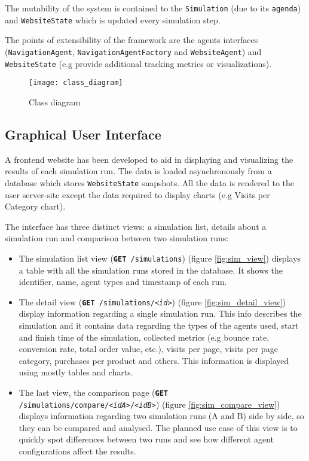The mutability of the system is contained to the \texttt{Simulation} (due to 
its \texttt{agenda}) and \texttt{WebsiteState} which is updated every 
simulation step.

The points of extensibility of the framework are the agents interfaces 
(\texttt{NavigationAgent}, \texttt{NavigationAgentFactory} and 
\texttt{WebsiteAgent}) and \texttt{WebsiteState} (e.g provide additional 
tracking metrics or visualizations).

\begin{figure}[h]
    \begin{center}
        \leavevmode
        \texttt{[image: class\_diagram]}
        \caption{Class diagram}
        \label{fig:class}
    \end{center}
\end{figure}


\subsection{Graphical User Interface}

A frontend website has been developed to aid in displaying and visualizing the 
results of each simulation run. The data is loaded asynchronously from a 
database which stores \texttt{WebsiteState} snapshots. All the data is rendered 
to the user server-site except the data required to display charts (e.g Visits 
per Category chart).

The interface has three distinct views: a simulation list, details about a 
simulation run and comparison between two simulation runs:

\begin{itemize}
    \item The simulation list view (\texttt{\textbf{GET} /simulations}) (figure 
    \ref{fig:sim_view}) displays a table 
    with all the simulation runs stored in the database. It shows the 
    identifier, name, agent types and timestamp of each run.
    \item The detail view (\texttt{\textbf{GET} /simulations/\textit{<id>}}) 
    (figure \ref{fig:sim_detail_view})
    display information regarding a single simulation run. This info describes 
    the simulation and it contains data regarding the types of the agents used, 
    start and finish time of the simulation, collected metrics (e.g bounce 
    rate, conversion rate, total order value, etc.), visits per page, visits 
    per page category, purchases per product and others. This information is 
    displayed using mostly tables and charts.
    \item The last view, the comparison page (\texttt{\textbf{GET} 
    /simulations/compare/\textit{<idA>}/\textit{<idB>}}) (figure 
    \ref{fig:sim_compare_view}) displays information 
    regarding two simulation runs (A and B) side by side, so they can be 
    compared and analysed. The planned use case of this view is to quickly spot 
    differences between two runs and see how different agent configurations 
    affect the results.
\end{itemize}


